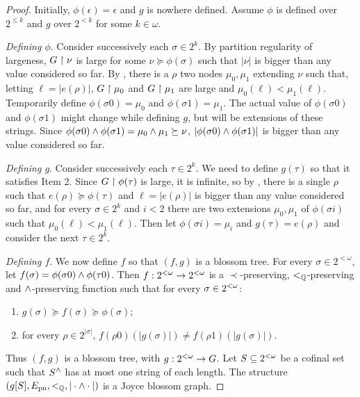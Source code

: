 \begin{proof}
Initially, $\phi(\epsilon) = \epsilon$ and $g$ is nowhere defined.
Assume $\phi$ is defined over $2^{\leq k}$ and $g$ over $2^{<k}$ for some $k \in \omega$.

\emph{Defining $\phi$}. Consider successively each $\sigma \in 2^k$. By partition regularity of largeness, $G \upharpoonright \nu$ is large for some $\nu \succeq \phi(\sigma)$ such that $|\nu|$ is bigger than any value considered so far. By , there is a $\rho$ two nodes $\mu_0, \mu_1$ extending $\nu$ such that, letting $\ell = |e(\rho)|$,  $G \upharpoonright \mu_0$ and $G \upharpoonright \mu_1$ are large and $\mu_0(\ell) < \mu_1(\ell)$.
Temporarily define $\phi(\sigma 0) = \mu_0$ and $\phi(\sigma 1) = \mu_1$. The actual value of $\phi(\sigma 0)$ and $\phi(\sigma 1)$ might change while defining $g$, but will be extensions of these strings. Since $\phi(\sigma 0) \wedge \phi(\sigma 1) = \mu_0 \wedge \mu_1 \succeq \nu$, $|\phi(\sigma 0) \wedge \phi(\sigma 1)|$ is bigger than any value considered so far.

\emph{Defining $g$}. Consider successively each $\tau \in 2^k$. We need to define $g(\tau)$ so that it satisfies Item 2.
Since $G \upharpoonright \phi(\tau)$ is large, it is infinite, so by , there is a single $\rho$ such that $e(\rho) \succeq \phi(\tau)$ and $\ell = |e(\rho)|$ is bigger than any value considered so far, and for every $\sigma \in 2^k$ and $i < 2$ there are two extensions $\mu_0, \mu_1$ of $\phi(\sigma i)$ such that $\mu_0(\ell) < \mu_1(\ell)$. Then let $\phi(\sigma i) = \mu_i$ and $g(\tau) = e(\rho)$ and consider the next $\tau \in 2^k$.


\emph{Defining $f$}. We now define $f$ so that $(f, g)$ is a blossom tree.
For every $\sigma \in 2^{<\omega}$, let $f(\sigma) = \phi(\sigma 0) \wedge \phi(\tau 0)$.
Then $f: {2^{<\omega}} \to {2^{<\omega}}$ is a $\prec$-preserving, $<_{\mathbb{Q}}$-preserving and $\wedge$-preserving function such that for every $\sigma \in {2^{<\omega}}$:
\begin{enumerate}
	\item $g(\sigma) \succeq f(\sigma) \succeq \phi(\sigma)$;
	\item\label{it:f-g-are-rado} for every $\rho \in 2^{|\sigma|}$, $f(\rho 0)(|g(\sigma)|) \neq f(\rho 1)(|g(\sigma)|)$.
\end{enumerate}
Thus $(f, g)$ is a blossom tree, with $g:{2^{<\omega}}\to G$. Let $S\subseteq{2^{<\omega}}$ be a cofinal set such that ${S}^{\wedge}$ has at most one string of each length. The structure $(g[S], E_{\mathrm{pn}}, <_{\mathbb{Q}}, |\cdot \wedge \cdot |)$ is a Joyce blossom graph. %
\end{proof}

